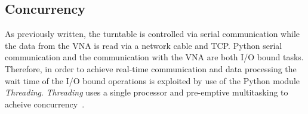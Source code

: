 \subsection{Concurrency}
As previously written, the turntable is controlled via serial communication while the data from the VNA is read via a network cable and TCP. Python serial communication and the communication with the VNA are both I/O bound tasks. Therefore, in order to achieve real-time communication and data processing the wait time of the I/O bound operations is exploited by use of the Python module \textit{Threading}. \textit{Threading} uses a single processor and pre-emptive multitasking to acheive concurrency~\cite{concurrency}. 
